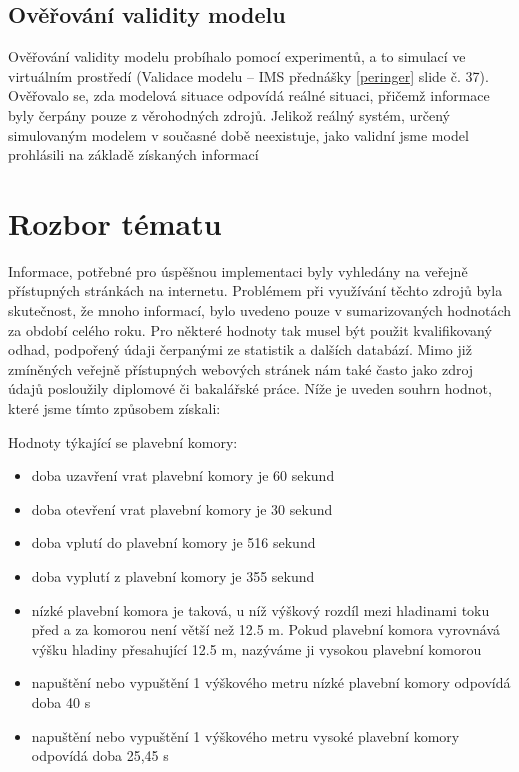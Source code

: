\documentclass[11pt,a4paper]{article}
\begin{document}
    \subsection{Ověřování validity modelu}

      Ověřování validity modelu probíhalo pomocí experimentů, a to simulací ve
      virtuálním prostředí (Validace modelu -- IMS přednášky \ref{peringer}
      slide č. 37). Ověřovalo se, zda modelová situace odpovídá reálné situaci,
      přičemž informace byly čerpány pouze z věrohodných zdrojů.
      Jelikož reálný systém, určený simulovaným modelem v současné době
      neexistuje, jako validní jsme model prohlásili na základě získaných
      informací

  \section{Rozbor tématu}

    Informace, potřebné pro úspěšnou implementaci byly vyhledány na veřejně
    přístupných stránkách na internetu. Problémem při využívání těchto zdrojů
    byla skutečnost, že mnoho informací, bylo uvedeno pouze v sumarizovaných
    hodnotách za období celého roku.  Pro některé hodnoty tak musel být použit
    kvalifikovaný odhad, podpořený údaji čerpanými ze statistik a dalších
    databází. Mimo již zmíněných veřejně přístupných webových stránek nám také
    často jako zdroj údajů posloužily diplomové či bakalářské práce. Níže je
    uveden souhrn hodnot, které jsme tímto způsobem získali:

    \noindent
    Hodnoty týkající se plavební komory:

    \begin{itemize}
      \item doba uzavření vrat plavební komory je 60 sekund
      \item doba otevření vrat plavební komory je 30 sekund
      \item doba vplutí do plavební komory je 516 sekund
      \item doba vyplutí z plavební komory je 355 sekund
      \item nízké plavební komora je taková, u níž výškový rozdíl mezi
            hladinami toku před a za komorou není větší než 12.5 m.
            Pokud plavební komora vyrovnává výšku hladiny přesahující 12.5 m,
            nazýváme ji vysokou plavební komorou
      \item napuštění nebo vypuštění 1 výškového metru nízké plavební komory
            odpovídá doba 40 s
      \item napuštění nebo vypuštění 1 výškového metru  vysoké plavební komory
            odpovídá doba 25,45 s
    \end{itemize}
\end{document}
